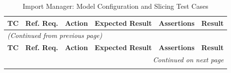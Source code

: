 \documentclass[12pt, titlepage]{article}
\begin{document}
\begin{longtable}{c
    >{\raggedright\arraybackslash}p{1.5cm}
    >{\raggedright\arraybackslash}p{3cm}
    >{\raggedright\arraybackslash}p{3cm}
  >{\raggedright\arraybackslash}p{5cm} c}
  \caption{Import Manager: Model Configuration and Slicing Test Cases}
  \label{table:im_config_tests} \\
  \toprule
  \textbf{TC} & \textbf{Ref. Req.} & \textbf{Action} &
  \textbf{Expected Result} & \textbf{Assertions} & \textbf{Result} \\
  \midrule
  \endfirsthead

  \multicolumn{6}{l}{\textit{(Continued from previous page)}} \\
  \toprule
  \textbf{TC} & \textbf{Ref. Req.} & \textbf{Action} &
  \textbf{Expected Result} & \textbf{Assertions} & \textbf{Result} \\
  \midrule
  \endhead

  \multicolumn{6}{r}{\textit{Continued on next page}} \\
  \endfoot

  \bottomrule
  \endlastfoot


\end{longtable}
\end{document}
